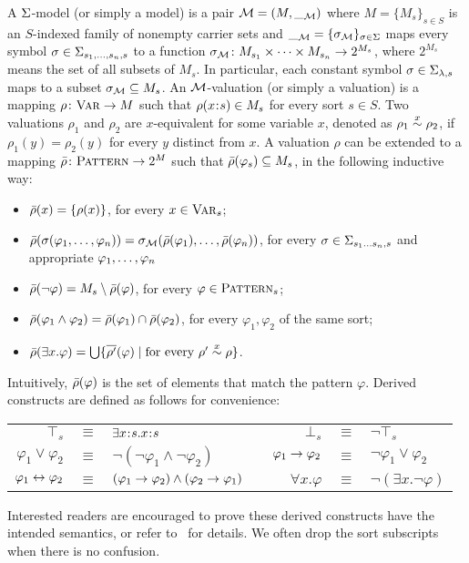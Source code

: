 \documentclass{amsart}
\begin{document}
A ${\Sigma}$-model (or simply a model) is a pair
$\mathcal{M} = (M, \__{\mathcal{M}})$ 
where $M = \{M_s\}_{s \in S}$ 
is an $S$-indexed family of nonempty carrier sets
and $\__{\mathcal{M}} = \{ {\sigma_{\mathcal{M}}} \}_{\sigma \in \Sigma}$
maps every symbol $\sigma \in \Sigma_{s_1 ,\dots, s_n , s}$
to a function
${\sigma_{\mathcal{M}}} \colon M_{s_1} \times \dots \times M_{s_n} \to 2^{M_s}$,
where $2^{M_s}$ means the set of all subsets of $M_s$.
In particular, each constant symbol
$\sigma \in \Sigma_{\lambda,s}$ 
maps to a subset ${\sigma_{\mathcal{M}}} \subseteq M_s$.
An $\mathcal{M}$-valuation (or simply a valuation) is a mapping
$\rho \colon \textnormal{\textsc{Var}} \to M$
such that $\rho(x \mathbin{\!:\!} s) \in M_s$ for every sort $s \in S$.
Two valuations $\rho_1$ and $\rho_2$ are $x$-equivalent for some variable $x$,
denoted as $\rho_1 \overset{x}{\sim} \rho_2$,
if $\rho_1(y) = \rho_2(y)$ for every $y$ distinct from $x$.
A valuation $\rho$ can be extended to a mapping
$\bar{\rho} \colon \textnormal{\textsc{Pattern}} \to 2^{M}$
such that $\bar{\rho}(\varphi_s) \subseteq M_s$,
in the following inductive way:
\begin{itemize}
\item $\bar{\rho}(x) = \{ \rho(x) \}$, for every $x \in \textnormal{\textsc{Var}}_s$;
\item $\bar{\rho}(\sigma(\varphi_1 ,\dots, \varphi_n))
       = {\sigma_{\mathcal{M}}}( \bar{\rho}(\varphi_1) ,\dots, \bar{\rho}(\varphi_n) )$,
      for every $\sigma \in \Sigma_{s_1 \dots s_n , s}$
      and appropriate $\varphi_1 ,\dots, \varphi_n$
\item $\bar{\rho}(\neg \varphi) = M_s \setminus \bar{\rho}(\varphi)$,
      for every $\varphi \in \textnormal{\textsc{Pattern}}_s$;
\item $\bar{\rho}(\varphi_1 \wedge \varphi_2)
       = \bar{\rho}(\varphi_1) \cap \bar{\rho}(\varphi_2)$,
      for every $\varphi_1,\varphi_2$ of the same sort;
\item $\bar{\rho}(\exists x . \varphi) 
       = \bigcup \{ \overline{\rho'}(\varphi) 
                    \mid \text{for every $\rho' \overset{x}{\sim} \rho$} \}$.
\end{itemize}
Intuitively,
$\bar{\rho}(\varphi)$ 
is the set of elements that match the pattern $\varphi$.
Derived constructs are defined as follows for convenience:
\begin{center}
\begin{tabular}{rclp{1cm}rcl}
$\top_s$ & $\equiv$ & $\exists x \mathbin{\!:\!} s . x \mathbin{\!:\!} s$
&&
$\bot_s$ & $\equiv$ & $\neg \top_s$
\\
$\varphi_1 \vee \varphi_2$ & $\equiv$ & 
$\neg (\neg \varphi_1 \wedge \neg \varphi_2)$
&&
$\varphi_1 \to \varphi_2$ & $\equiv$ &
$\neg \varphi_1 \vee \varphi_2$
\\
$\varphi_1 \leftrightarrow \varphi_2$ & $\equiv$ &
$(\varphi_1 \to \varphi_2) \wedge (\varphi_2 \to \varphi_1)$
&&
$\forall x . \varphi$ & $\equiv$ &
$\neg (\exists x . \neg \varphi)$
\end{tabular}
\end{center}
Interested readers are encouraged to prove these derived constructs
have the intended semantics,
or refer to~\cite{bibid} for details.
We often drop the sort subscripts when there is no confusion.
\end{document}
